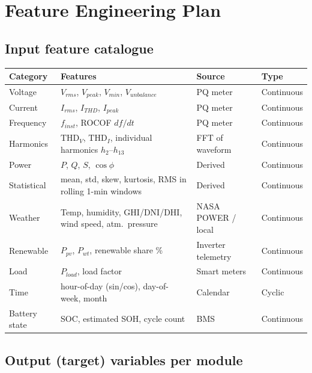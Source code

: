 \documentclass[11pt,a4paper]{article}
\begin{document}
\section{Feature Engineering Plan}

\subsection{Input feature catalogue}

\begin{longtable}{p{2.6cm}p{6.4cm}p{2.8cm}p{2.0cm}}
\toprule
\textbf{Category} & \textbf{Features} & \textbf{Source} & \textbf{Type} \\
\midrule
\endhead

Voltage      & $V_{rms}$, $V_{peak}$, $V_{min}$, $V_{unbalance}$ & PQ meter & Continuous \\
Current      & $I_{rms}$, $I_{THD}$, $I_{peak}$ & PQ meter & Continuous \\
Frequency    & $f_{inst}$, ROCOF $df/dt$ & PQ meter & Continuous \\
Harmonics    & $\mathrm{THD}_V$, $\mathrm{THD}_I$, individual harmonics $h_2$--$h_{13}$ & FFT of waveform & Continuous \\
Power        & $P$, $Q$, $S$, $\cos\phi$ & Derived & Continuous \\
Statistical  & mean, std, skew, kurtosis, RMS in rolling 1-min windows & Derived & Continuous \\
Weather      & Temp, humidity, GHI/DNI/DHI, wind speed, atm.\ pressure & NASA POWER / local & Continuous \\
Renewable    & $P_{pv}$, $P_{wt}$, renewable share \% & Inverter telemetry & Continuous \\
Load         & $P_{load}$, load factor & Smart meters & Continuous \\
Time         & hour-of-day (sin/cos), day-of-week, month & Calendar & Cyclic \\
Battery state & SOC, estimated SOH, cycle count & BMS & Continuous \\
\bottomrule
\end{longtable}

\subsection{Output (target) variables per module}
\end{document}
